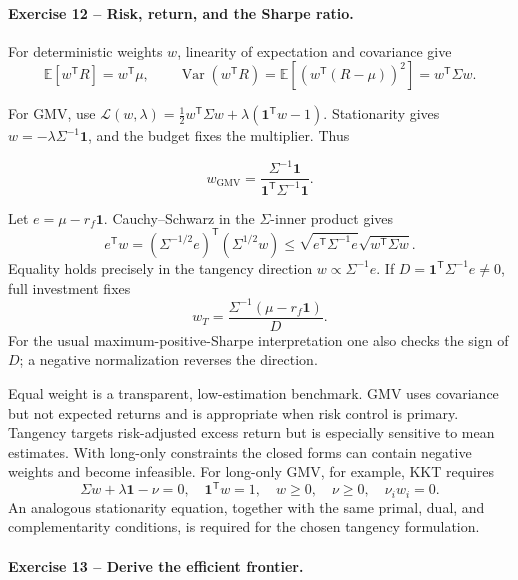 \documentclass[10pt]{article}
\newcommand{\trans}{^{\mathsf T}}
\begin{document}
\paragraph{Exercise 12 -- Risk, return, and the Sharpe ratio.}

For deterministic weights \(w\), linearity of expectation and covariance give
\[
\mathbb E[w\trans R]=w\trans\mu,
\qquad
\operatorname{Var}(w\trans R)
=\mathbb E[(w\trans(R-\mu))^2]=w\trans\Sigma w.
\]

For GMV, use
\(\mathcal L(w,\lambda)=\frac12w\trans\Sigma w
+\lambda(\mathbf1\trans w-1)\). Stationarity gives
\(w=-\lambda\Sigma^{-1}\mathbf1\), and the budget fixes the multiplier.
Thus
\begin{resultbox}
\[
w_{\mathrm{GMV}}
=\frac{\Sigma^{-1}\mathbf1}
{\mathbf1\trans\Sigma^{-1}\mathbf1}.
\]
\end{resultbox}

Let \(e=\mu-r_f\mathbf1\). Cauchy--Schwarz in the \(\Sigma\)-inner product
gives
\[
e\trans w
=(\Sigma^{-1/2}e)\trans(\Sigma^{1/2}w)
\leq\sqrt{e\trans\Sigma^{-1}e}\sqrt{w\trans\Sigma w}.
\]
Equality holds precisely in the tangency direction
\(w\propto\Sigma^{-1}e\). If
\(D=\mathbf1\trans\Sigma^{-1}e\ne0\), full investment fixes
\[
w_T=\frac{\Sigma^{-1}(\mu-r_f\mathbf1)}{D}.
\]
For the usual maximum-positive-Sharpe interpretation one also checks the sign
of \(D\); a negative normalization reverses the direction.

Equal weight is a transparent, low-estimation benchmark. GMV uses covariance
but not expected returns and is appropriate when risk control is primary.
Tangency targets risk-adjusted excess return but is especially sensitive to
mean estimates. With long-only constraints the closed forms can contain
negative weights and become infeasible. For long-only GMV, for example, KKT
requires
\[
\Sigma w+\lambda\mathbf1-\nu=0,
\quad \mathbf1\trans w=1,
\quad w\geq0,
\quad \nu\geq0,
\quad \nu_iw_i=0.
\]
An analogous stationarity equation, together with the same primal, dual, and
complementarity conditions, is required for the chosen tangency formulation.

\paragraph{Exercise 13 -- Derive the efficient frontier.}
\end{document}
